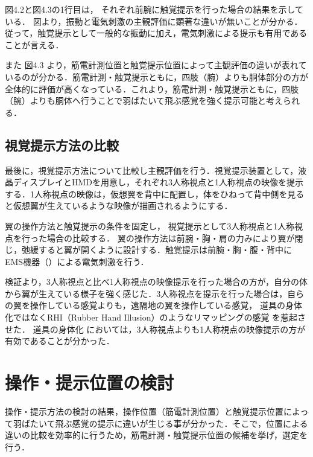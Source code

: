         図4.2と図4.3の1行目は，
        それぞれ前腕に触覚提示を行った場合の結果を示している．
        図より，振動と電気刺激の主観評価に顕著な違いが無いことが分かる．従って，触覚提示として一般的な振動に加え，電気刺激による提示も有用であることが言える．

        また
        図4.3
        より，筋電計測位置と触覚提示位置によって主観評価の違いが表れているのが分かる．筋電計測・触覚提示ともに，四肢（腕）よりも胴体部分の方が全体的に評価が高くなっている．これより，筋電計測・触覚提示ともに，四肢（腕）よりも胴体へ行うことで羽ばたいて飛ぶ感覚を強く提示可能と考えられる．
        

    \subsection{視覚提示方法の比較}
        最後に，視覚提示方法について比較し主観評価を行う．視覚提示装置として，液晶ディスプレイとHMDを用意し，それぞれ3人称視点と1人称視点の映像を提示する．1人称視点の映像は，仮想翼を背中に配置し，体をひねって背中側を見ると仮想翼が生えているような映像が描画されるようにする．

        翼の操作方法と触覚提示の条件を固定し，
        視覚提示として3人称視点と1人称視点を行った場合の比較する．
        翼の操作方法は前腕・胸・肩の力みにより翼が閉じ，弛緩すると翼が開くように設計する．触覚提示は前腕・胸・腹・背中にEMS機器（）による電気刺激を行う．

        検証より，3人称視点と比べ1人称視点の映像提示を行った場合の方が，自分の体から翼が生えている様子を強く感じた．3人称視点を提示を行った場合は，自らの翼を操作している感覚よりも，遠隔地の翼を操作している感覚，
        道具の身体化ではなくRHI（Rubber Hand Illusion）のようなリマッピングの感覚
        を惹起させた．
        道具の身体化
        においては，3人称視点よりも1人称視点の映像提示の方が有効であることが分かった．
    
\section{操作・提示位置の検討}
    操作・提示方法の検討の結果，操作位置（筋電計測位置）と触覚提示位置によって羽ばたいて飛ぶ感覚の提示に違いが生じる事が分かった．そこで，位置による違いの比較を効率的に行うため，筋電計測・触覚提示位置の候補を挙げ，選定を行う．
    
